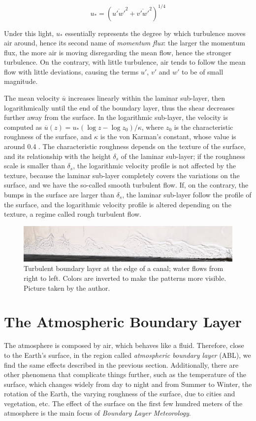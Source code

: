 \documentclass[a4paper,11pt]{kth-mag}
\begin{document}
\begin{equation}
\label{eq:ustar_momentum}
u_*=\left(\overline{u'w'}^2+\overline{v'w'}^2\right)^{1/4}
\end{equation}

Under this light, $u_*$ essentially represents the degree by which turbulence moves air around, hence its second name of \emph{momentum flux}: the larger the momentum flux, the more air is moving disregarding the mean flow, hence the stronger turbulence. On the contrary, with little turbulence, air tends to follow the mean flow with little deviations, causing the terms $u'$, $v'$ and $w'$ to be of small magnitude.

The mean velocity $\overline{u}$ increases linearly within the laminar sub-layer, then logarithmically until the end of the boundary layer, thus the shear decreases further away from the surface. In the logarithmic sub-layer, the velocity is computed as $\overline{u}(z)=u_*(\log z - \log z_0)/\kappa$, where $z_0$ is the characteristic roughness of the surface, and $\kappa$ is the von Karman's constant, whose value is around 0.4 \cite{basicatm}. The characteristic roughness depends on the texture of the surface, and its relationship with the height $\delta_s$ of the laminar sub-layer; if the roughness scale is smaller than $\delta_s$, the logarithmic velocity profile is not affected by the texture, because the laminar sub-layer completely covers the variations on the surface, and we have the so-called smooth turbulent flow. If, on the contrary, the bumps in the surface are larger than $\delta_s$, the laminar sub-layer follow the profile of the surface, and the logarithmic velocity profile is altered depending on the texture, a regime called rough turbulent flow.

\begin{figure}
\caption{Turbulent boundary layer at the edge of a canal; water flows from right to left. Colors are inverted to make the patterns more visible. Picture taken by the author.}
\label{fig:bl}
\centering
\includegraphics[width=\textwidth]{images/bl}
\end{figure}

\section{The Atmospheric Boundary Layer}
\label{sec:abl}
The atmosphere is composed by air, which behaves like a fluid. Therefore, close to the Earth's surface, in the region called \emph{atmospheric boundary layer} (ABL), we find the same effects described in the previous section. Additionally, there are other phenomena that complicate things further, such as the temperature of the surface, which changes widely from day to night and from Summer to Winter, the rotation of the Earth, the varying roughness of the surface, due to cities and vegetation, etc. The effect of the surface on the first few hundred meters of the atmosphere is the main focus of \emph{Boundary Layer Meteorology}.
\end{document}
